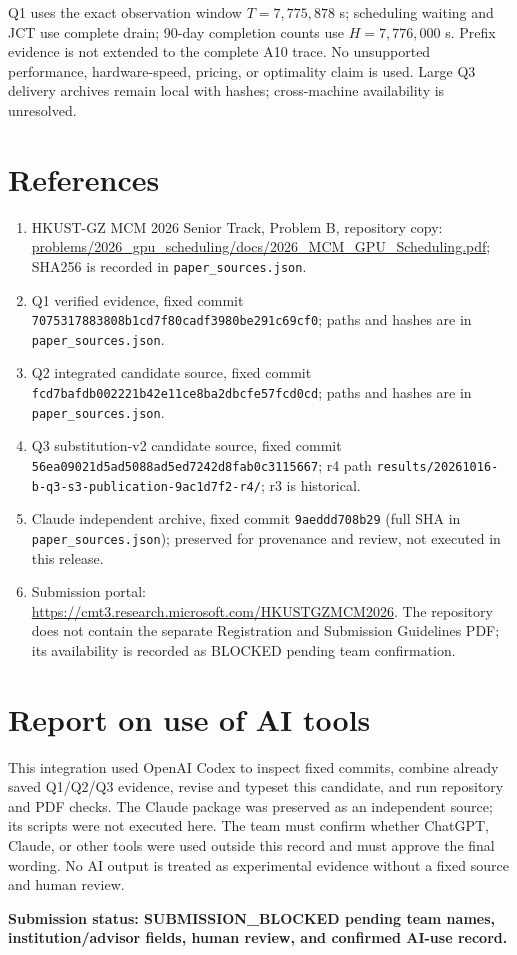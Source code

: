 Q1 uses the exact observation window $T=7,775,878$ s; scheduling waiting and JCT use complete drain; 90-day completion counts use $H=7,776,000$ s. Prefix evidence is not extended to the complete A10 trace. No unsupported performance, hardware-speed, pricing, or optimality claim is used. Large Q3 delivery archives remain local with hashes; cross-machine availability is unresolved.

\section*{References}
\sloppy
\begin{enumerate}
\item HKUST-GZ MCM 2026 Senior Track, Problem B, repository copy: \url{problems/2026_gpu_scheduling/docs/2026_MCM_GPU_Scheduling.pdf}; SHA256 is recorded in \texttt{paper\_sources.json}.
\item Q1 verified evidence, fixed commit \texttt{7075317883808b1cd7f80cadf3980be291c69cf0}; paths and hashes are in \texttt{paper\_sources.json}.
\item Q2 integrated candidate source, fixed commit \texttt{fcd7bafdb002221b42e11ce8ba2dbcfe57fcd0cd}; paths and hashes are in \texttt{paper\_sources.json}.
\item Q3 substitution-v2 candidate source, fixed commit \texttt{56ea09021d5ad5088ad5ed7242d8fab0c3115667}; r4 path \texttt{results/20261016-b-q3-s3-publication-9ac1d7f2-r4/}; r3 is historical.
\item Claude independent archive, fixed commit \texttt{9aeddd708b29} (full SHA in \texttt{paper\_sources.json}); preserved for provenance and review, not executed in this release.
\item Submission portal: \url{https://cmt3.research.microsoft.com/HKUSTGZMCM2026}. The repository does not contain the separate Registration and Submission Guidelines PDF; its availability is recorded as BLOCKED pending team confirmation.
\end{enumerate}

\clearpage
\section*{Report on use of AI tools}
This integration used OpenAI Codex to inspect fixed commits, combine already saved Q1/Q2/Q3 evidence, revise and typeset this candidate, and run repository and PDF checks. The Claude package was preserved as an independent source; its scripts were not executed here. The team must confirm whether ChatGPT, Claude, or other tools were used outside this record and must approve the final wording. No AI output is treated as experimental evidence without a fixed source and human review.

\textbf{Submission status: SUBMISSION\_BLOCKED pending team names, institution/advisor fields, human review, and confirmed AI-use record.}

